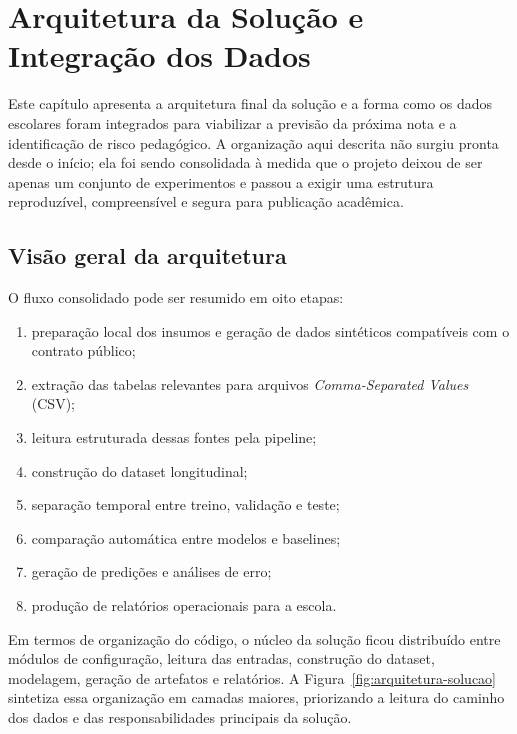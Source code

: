 \chapter{Arquitetura da Solu\c{c}\~ao e Integra\c{c}\~ao dos Dados}
\label{cap:arquitetura}

Este cap\'itulo apresenta a arquitetura final da solu\c{c}\~ao e a forma como os dados escolares foram integrados para viabilizar a previs\~ao da pr\'oxima nota e a identifica\c{c}\~ao de risco pedag\'ogico. A organiza\c{c}\~ao aqui descrita n\~ao surgiu pronta desde o in\'icio; ela foi sendo consolidada \`a medida que o projeto deixou de ser apenas um conjunto de experimentos e passou a exigir uma estrutura reproduz\'ivel, compreens\'ivel e segura para publica\c{c}\~ao acad\^emica.

\section{Vis\~ao geral da arquitetura}
\label{sec:visao-geral}
\label{sec:visao-geral-solucao}

O fluxo consolidado pode ser resumido em oito etapas:
\begin{enumerate}
    \item prepara\c{c}\~ao local dos insumos e gera\c{c}\~ao de dados sintéticos compat\'iveis com o contrato p\'ublico;
    \item extra\c{c}\~ao das tabelas relevantes para arquivos \textit{Comma-Separated Values} (CSV);
    \item leitura estruturada dessas fontes pela pipeline;
    \item constru\c{c}\~ao do dataset longitudinal;
    \item separa\c{c}\~ao temporal entre treino, valida\c{c}\~ao e teste;
    \item compara\c{c}\~ao autom\'atica entre modelos e baselines;
    \item gera\c{c}\~ao de predi\c{c}\~oes e an\'alises de erro;
    \item produ\c{c}\~ao de relat\'orios operacionais para a escola.
\end{enumerate}

Em termos de organiza\c{c}\~ao do c\'odigo, o n\'ucleo da solu\c{c}\~ao ficou distribu\'ido entre m\'odulos de configura\c{c}\~ao, leitura das entradas, constru\c{c}\~ao do dataset, modelagem, gera\c{c}\~ao de artefatos e relat\'orios. A Figura~\ref{fig:arquitetura-solucao} sintetiza essa organiza\c{c}\~ao em camadas maiores, priorizando a leitura do caminho dos dados e das responsabilidades principais da solu\c{c}\~ao.

